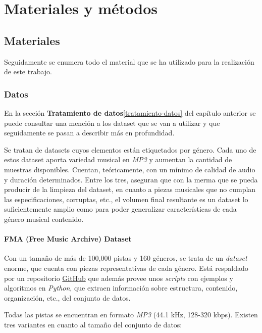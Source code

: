 
\cleardoublepage

\chapter{Materiales y métodos}

\section{Materiales}
Seguidamente se enumera todo el material que se ha utilizado para la realización de este trabajo.

\subsection{Datos}
\label{materiales-datos}

En la sección \textbf{Tratamiento de datos}\ref{tratamiento-datos} del capítulo anterior se puede consultar una mención a los dataset que se van a utilizar y que seguidamente se pasan a describir más en profundidad.

Se tratan de datasets cuyos elementos están etiquetados por género. Cada uno de estos dataset aporta variedad musical en \emph{MP3} y aumentan la cantidad de muestras disponibles. Cuentan, teóricamente, con un mínimo de calidad de audio y duración determinados. Entre los tres, aseguran que con la merma que se pueda producir de la limpieza del dataset, en cuanto a piezas musicales que no cumplan las especificaciones, corruptas, etc., el volumen final resultante es un dataset lo suficientemente amplio como para poder generalizar características de cada género musical contenido.

\subsubsection{FMA (Free Music Archive) Dataset}

Con un tamaño de más de 100,000 pistas y 160 géneros, se trata de un \emph{dataset} enorme, que cuenta con piezas representativas de cada género. Está respaldado por un repositorio \href{https://github.com/mdeff/fma}{GitHub} que además provee unos \emph{scripts} con ejemplos y algoritmos en \emph{Python}, que extraen información sobre estructura, contenido, organización, etc., del conjunto de datos.

Todas las pistas se encuentran en formato \emph{MP3} (44.1 kHz, 128-320 kbps). Existen tres variantes en cuanto al tamaño del conjunto de datos:

